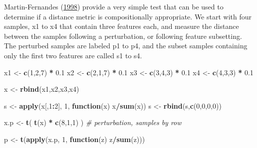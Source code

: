 \documentclass[onecolumn]{book}
\newenvironment{Shaded}{\begin{snugshade}}{\end{snugshade}}
\newcommand{\CommentTok}[1]{\textcolor[rgb]{0.56,0.35,0.01}{\textit{#1}}}
\newcommand{\ControlFlowTok}[1]{\textcolor[rgb]{0.13,0.29,0.53}{\textbf{#1}}}
\newcommand{\DecValTok}[1]{\textcolor[rgb]{0.00,0.00,0.81}{#1}}
\newcommand{\FloatTok}[1]{\textcolor[rgb]{0.00,0.00,0.81}{#1}}
\newcommand{\KeywordTok}[1]{\textcolor[rgb]{0.13,0.29,0.53}{\textbf{#1}}}
\newcommand{\NormalTok}[1]{#1}
\newcommand{\OperatorTok}[1]{\textcolor[rgb]{0.81,0.36,0.00}{\textbf{#1}}}
\newcommand{\StringTok}[1]{\textcolor[rgb]{0.31,0.60,0.02}{#1}}
\theoremstyle{definition}
\theoremstyle{definition}
\theoremstyle{definition}
\theoremstyle{remark}
\begin{document}
Martin-Fernandes (\protect\hyperlink{ref-martin1998measures}{1998})
provide a very simple test that can be used to determine if a distance
metric is compositionally appropriate. We start with four samples, x1 to
x4 that contain three features each, and measure the distance between
the samples following a perturbation, or following feature subsetting.
The perturbed samples are labeled p1 to p4, and the subset samples
containing only the first two features are called s1 to s4.

\begin{Shaded}
\begin{Highlighting}[]
\NormalTok{x1 <-}\StringTok{ }\KeywordTok{c}\NormalTok{(}\DecValTok{1}\NormalTok{,}\DecValTok{2}\NormalTok{,}\DecValTok{7}\NormalTok{) }\OperatorTok{*}\StringTok{ }\FloatTok{0.1}
\NormalTok{x2 <-}\StringTok{ }\KeywordTok{c}\NormalTok{(}\DecValTok{2}\NormalTok{,}\DecValTok{1}\NormalTok{,}\DecValTok{7}\NormalTok{) }\OperatorTok{*}\StringTok{ }\FloatTok{0.1}
\NormalTok{x3 <-}\StringTok{ }\KeywordTok{c}\NormalTok{(}\DecValTok{3}\NormalTok{,}\DecValTok{4}\NormalTok{,}\DecValTok{3}\NormalTok{) }\OperatorTok{*}\StringTok{ }\FloatTok{0.1}
\NormalTok{x4 <-}\StringTok{ }\KeywordTok{c}\NormalTok{(}\DecValTok{4}\NormalTok{,}\DecValTok{3}\NormalTok{,}\DecValTok{3}\NormalTok{) }\OperatorTok{*}\StringTok{ }\FloatTok{0.1}

\NormalTok{x <-}\StringTok{ }\KeywordTok{rbind}\NormalTok{(x1,x2,x3,x4)}

\NormalTok{s <-}\StringTok{ }\KeywordTok{apply}\NormalTok{(x[,}\DecValTok{1}\OperatorTok{:}\DecValTok{2}\NormalTok{], }\DecValTok{1}\NormalTok{, }\ControlFlowTok{function}\NormalTok{(x) x}\OperatorTok{/}\KeywordTok{sum}\NormalTok{(x))}
\NormalTok{s <-}\StringTok{ }\KeywordTok{rbind}\NormalTok{(s,}\KeywordTok{c}\NormalTok{(}\DecValTok{0}\NormalTok{,}\DecValTok{0}\NormalTok{,}\DecValTok{0}\NormalTok{,}\DecValTok{0}\NormalTok{))}

\NormalTok{x.p <-}\StringTok{ }\KeywordTok{t}\NormalTok{( }\KeywordTok{t}\NormalTok{(x) }\OperatorTok{*}\StringTok{ }\KeywordTok{c}\NormalTok{(}\DecValTok{8}\NormalTok{,}\DecValTok{1}\NormalTok{,}\DecValTok{1}\NormalTok{) ) }\CommentTok{# perturbation, samples by row}

\NormalTok{p <-}\StringTok{ }\KeywordTok{t}\NormalTok{(}\KeywordTok{apply}\NormalTok{(x.p, }\DecValTok{1}\NormalTok{, }\ControlFlowTok{function}\NormalTok{(z) z}\OperatorTok{/}\KeywordTok{sum}\NormalTok{(z)))}
\end{Highlighting}
\end{Shaded}
\end{document}
